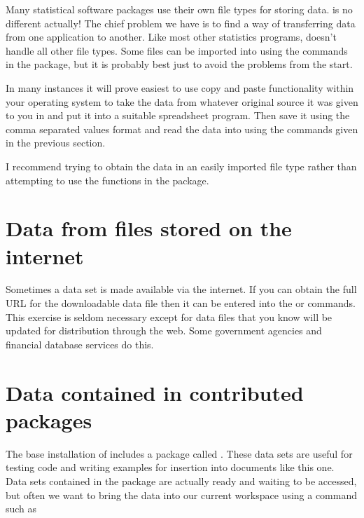 Many statistical software packages use their own file types for storing data. \R{} is no different actually! The chief problem we have is to find a way of transferring data from one application to another. Like most other statistics programs, \R{} doesn't handle all other file types. Some files can be imported into \R{} using the commands in the  package, but it is probably best just to avoid the problems from the start. 
 
In many instances it will prove easiest to use copy and paste functionality within your operating system to take the data from whatever original source it was given to you in and put it into a suitable spreadsheet program. Then save it using the comma separated values format and read the data into \R{} using the commands given in the previous section. 
 
I recommend trying to obtain the data in an easily imported file type rather than attempting to use the functions in the  package. 
 
\section{Data from files stored on the internet} 
 
Sometimes a data set is made available via the internet. If you can obtain the full URL for the downloadable data file then it can be entered into the  or  commands. This exercise is seldom necessary except for data files that you know will be updated for distribution through the web. Some government agencies and financial database services do this. 
 
\section{Data contained in contributed packages} 
\label{DataFromPackages} 
 
 
The base installation of \R{} includes a package called . These data sets are useful for testing code and writing examples for insertion into documents like this one. Data sets contained in the  package are actually ready and waiting to be accessed, but often we want to bring the data into our current workspace using a command such as 

